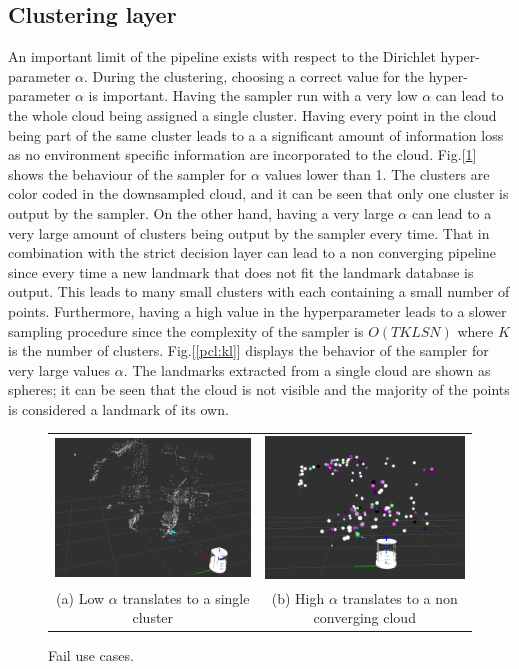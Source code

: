 \documentclass[twoside,hidelinks]{article}
\begin{document}
\subsection{Clustering layer}


An important limit of the pipeline exists with respect to the Dirichlet hyper-parameter $\alpha$. During the clustering, choosing a correct value for the hyper-parameter $\alpha$ is important. Having the sampler run with a very low $\alpha$ can lead to the whole cloud being assigned a single cluster. Having every point in the cloud being part of the same cluster leads to a a significant amount of information loss as no environment specific information are incorporated to the cloud. Fig.[\ref{pip:limits}] shows the behaviour of the sampler for $\alpha$ values lower than 1. The clusters are color coded in the downsampled cloud, and it can be seen that only one cluster is output by the sampler. On the other hand, having a very large $\alpha$ can lead to a very large amount of clusters being output by the sampler every time. That in combination with the strict decision layer can lead to a non converging pipeline since every time a new landmark that does not fit the landmark database is output. This leads to many small clusters with each containing a small number of points. Furthermore, having a high value in the hyperparameter leads to a slower sampling procedure since the complexity of the sampler is $O(TKLSN)$ where $K$ is the number of clusters. Fig.[\ref{pcl:kl}] displays the behavior of the sampler for very large values $\alpha$. The landmarks extracted from a single cloud are shown as spheres; it can be seen that the cloud is not visible and the majority of the points is considered a landmark of its own.


\begin{figure}
\begin{tabular}{cc}
    \includegraphics[width=.5\textwidth]{singlecluster} &  \includegraphics[width=.5\textwidth]{onlyclusters2} \\
  (a) Low $\alpha$ translates to a single cluster  & (b) High $\alpha$ translates to a non converging cloud \\[6pt]
\end{tabular}
\caption{Fail use cases.}
  \label{pip:limits}
\end{figure}
\end{document}
